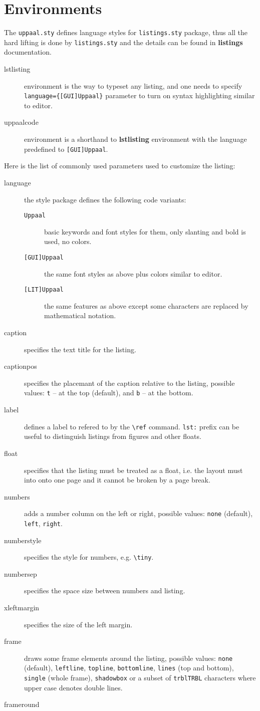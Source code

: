 \documentclass[english,paper=a4,final]{article}
\begin{document}
\section{Environments}
The {\tt uppaal.sty} defines \uppaal language styles for {\tt listings.sty} package, thus all the hard lifting is done by {\tt listings.sty} and the details can be found in {\bf listings} documentation.
\begin{description}
\item[lstlisting] environment is the way to typeset any listing, and one needs to specify {\tt language=\{[GUI]Uppaal\}} parameter to turn on syntax highlighting similar to \uppaal editor.
\item[uppaalcode] environment is a shorthand to {\bf lstlisting} environment with the language predefined to {\tt [GUI]Uppaal}.
\end{description}
Here is the list of commonly used parameters used to customize the listing:
\begin{description}
\item[language] the style package defines the following \uppaal code variants:
  \begin{description}
  \item[{\tt Uppaal}] basic \uppaal keywords and font styles for them, only slanting and bold is used, no colors.
  \item[{\tt [GUI]Uppaal}] the same font styles as above plus colors similar to \uppaal editor.
  \item[{\tt [LIT]Uppaal}] the same features as above except some characters are replaced by mathematical notation.
  \end{description}
\item[caption] specifies the text title for the listing.
\item[captionpos] specifies the placemant of the caption relative to the listing, possible values: {\tt t} -- at the top (default), and {\tt b} -- at the bottom.
\item[label] defines a label to refered to by the {\tt \textbackslash ref} command. {\tt lst:} prefix can be useful to distinguish listings from figures and other floats.
\item[float] specifies that the listing must be treated as a float, i.e. the layout must into onto one page and it cannot be broken by a page break.
\item[numbers] adds a number column on the left or right, possible values: {\tt none} (default), {\tt left}, {\tt right}.
\item[numberstyle] specifies the style for numbers, e.g. {\tt \textbackslash tiny}.
\item[numbersep] specifies the space size between numbers and listing.
\item[xleftmargin] specifies the size of the left margin.
\item[frame] draws some frame elements around the listing, possible values: {\tt none} (default), {\tt leftline}, {\tt topline}, {\tt bottomline}, {\tt lines} (top and bottom), {\tt single} (whole frame), {\tt shadowbox} or a subset of {\tt trblTRBL} characters where upper case denotes double lines.
\item[frameround]
\end{description}
\end{document}
